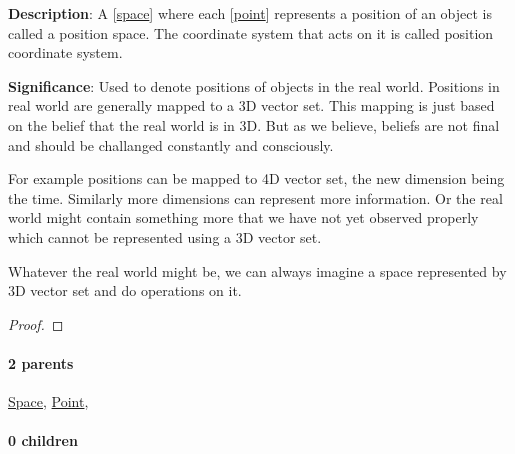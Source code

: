 \documentclass[../main.tex]{subfiles}
\begin{document}
\begin{statement}
\label{statement:Position Space}\hspace*{0pt}\par
\end{statement}
\textbf{Description}:
A [\hyperref[statement:Space]{space}] where each [\hyperref[statement:Point]{point}] represents a position of an object is called a position space.
The coordinate system that acts on it is called position coordinate system.
\par
{\color{magenta} \textbf{Significance}:
Used to denote positions of objects in the real world.
Positions in real world are generally mapped to a 3D vector set.
This mapping is just based on the belief that the real world is in 3D.
But as we believe, beliefs are not final and should be challanged constantly and consciously.

For example positions can be mapped to 4D vector set, the new dimension being the time.
Similarly more dimensions can represent more information.
Or the real world might contain something more that we have not yet observed properly which cannot be represented using a 3D vector set.

Whatever the real world might be, we can always imagine a space represented by 3D vector set and do operations on it.

\par}
\begin{proof}
\proofbydefinition
\end{proof}\par
\paragraph{2 parents} \hyperref[statement:Space]{Space}, \hyperref[statement:Point]{Point}, 
\paragraph{0 children} 
\end{document}
